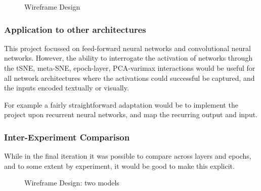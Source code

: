 \documentclass[a4paper,11pt,titlepage]{article}
\begin{document}
	\begin{figure}[H]
    			\caption{Wireframe Design}%
	\end{figure}	
	
	\subsubsection{Application to other architectures}
	This project focussed on feed-forward neural networks and convolutional neural networks. However, the ability to interrogate the activation of networks through the tSNE, meta-SNE, epoch-layer, PCA-varimax interactions would be useful for all network architectures where the activations could successful be captured, and the inputs encoded textually or visually.
	\par 
	For example a fairly straightforward adaptation would be to implement the project upon recurrent neural networks, and map the recurring output and input.

	\subsubsection{Inter-Experiment Comparison}
	While in the final iteration it was possible to compare across layers and epochs, and to some extent by experiment, it would be good to make this explicit.
	\par 
		
	\begin{figure}[H]
    			\caption{Wireframe Design: two models}%
	\end{figure}	
	
\end{document}
